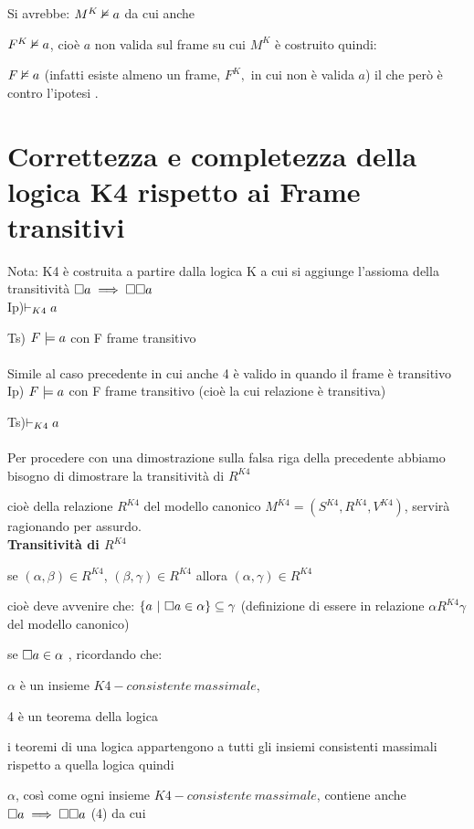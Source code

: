 Si avrebbe: $M^{K}\nvDash a$ da cui anche

$F^{K}\nvDash a$, cioè $a$ non valida sul frame su cui $M^{K}$
è costruito quindi:

$F\nvDash a$ (infatti esiste almeno un frame, $F^{K},$ in cui non
è valida $a$) il che però è contro l'ipotesi \lightning.


\section{Correttezza e completezza della logica K4 rispetto ai Frame transitivi}

Nota: K4 è costruita a partire dalla logica K a cui si aggiunge l'assioma
della transitività $\square a\implies\square\square a$ \\
 Ip)$\vdash_{K4}a$

Ts) $F\models a$ con F frame transitivo\\
 \\
 Simile al caso precedente in cui anche 4 è valido in quando il frame
è transitivo\\


Ip) $F\models a$ con F frame transitivo (cioè la cui relazione è
transitiva)

Ts)$\vdash_{K4}a$\\
 \\
 Per procedere con una dimostrazione sulla falsa riga della precedente
abbiamo bisogno di dimostrare la transitività di $R^{K4}$

cioè della relazione $R^{K4}$ del modello canonico $M^{K4}=(S^{K4},R^{K4},V^{K4})$,
servirà ragionando per assurdo.\\


\textbf{Transitività di $R^{K4}$ }

se $(\alpha,\beta)\in R^{K4}$, $(\beta,\gamma)\in R^{K4}$ allora
$(\alpha,\gamma)\in R^{K4}$

cioè deve avvenire che: $\{a\ |\ \boa\in\alpha\}\subseteq\gamma$
(definizione di essere in relazione $\alpha R^{K4}\gamma$ del modello
canonico)

se $\square a\in\alpha$ , ricordando che:

$\alpha$ è un insieme $K4-consistente\ massimale$,

4 è un teorema della logica

i teoremi di una logica appartengono a tutti gli insiemi consistenti
massimali rispetto a quella logica quindi

$\alpha$, così come ogni insieme $K4-consistente\ massimale$, contiene
anche $\square a\implies\square\square a$ (4) da cui

